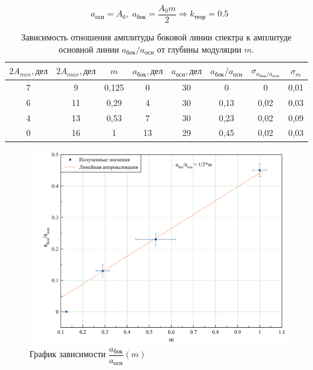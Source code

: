 \documentclass[a4paper, 12pt,twoside]{article}
\begin{document}
$$a_\text{осн} = A_0, \; a_\text{бок}= \frac{A_0m}{2} \Rightarrow k_\text{теор} =0.5$$
	
\begin{table}[H]
\centering
\caption{Зависимость отношения амплитуды боковой линии спектра к амплитуде основной линии $a_\text{бок}/a_\text{осн}$ от глубины модуляции $m$.}
\begin{tabular}{|c|c|c|c|c|c|c|c|}
\hline
$2A_{min}, \text{дел}$ & $2A_{max}, \text{дел}$ & $m$  & $a_\text{бок}, \text{дел}$ & $a_\text{осн}, \text{дел}$ & $a_\text{бок}/a_\text{осн}$ & $\sigma_{a_\text{бок}/a_\text{осн}}$ & $\sigma_{m}$ \\ \hline
7                & 9                & 0,125 & 0                      & 30                   &0                         & 0     & 0,01                      \\ \hline
6                & 11                & 0,29 & 4                      & 30                      & 0,13                        & 0,02                         &0,03     \\ \hline
4                & 13                & 0,53 & 7		                      & 30                      & 0,23                        & 0,02                          &0,09     \\ \hline
0                & 16                & 1 & 13                      & 29                      & 0,45                        & 0,02                           &0,03    \\ \hline
\end{tabular}
\end{table}

\begin{figure}[H]
\centering
\includegraphics[width = \textwidth]{graphic2}
\caption{График зависимости $\dfrac{a_\text{бок}}{a_\text{осн}}(m)$}
\end{figure}
\end{document}
